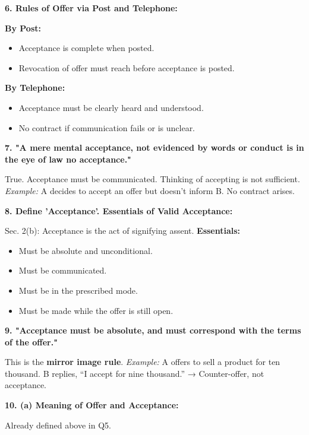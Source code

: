 \documentclass[12pt,a4paper]{book}
\begin{document}
\vspace{0.5cm}
\textbf{6. Rules of Offer via Post and Telephone:}  

\textbf{By Post:}
\begin{itemize}
    \item Acceptance is complete when posted.
    \item Revocation of offer must reach before acceptance is posted.
\end{itemize}

\textbf{By Telephone:}
\begin{itemize}
    \item Acceptance must be clearly heard and understood.
    \item No contract if communication fails or is unclear.
\end{itemize}

\vspace{0.5cm}
\textbf{7. "A mere mental acceptance, not evidenced by words or conduct is in the eye of law no acceptance."}  

True. Acceptance must be communicated. Thinking of accepting is not sufficient.  
\textit{Example:} A decides to accept an offer but doesn’t inform B. No contract arises.

\vspace{0.5cm}
\textbf{8. Define 'Acceptance'. Essentials of Valid Acceptance:}  

Sec. 2(b): Acceptance is the act of signifying assent.  
\textbf{Essentials:}
\begin{itemize}
    \item Must be absolute and unconditional.
    \item Must be communicated.
    \item Must be in the prescribed mode.
    \item Must be made while the offer is still open.
\end{itemize}

\vspace{0.5cm}
\textbf{9. "Acceptance must be absolute, and must correspond with the terms of the offer."}  

This is the \textbf{mirror image rule}.  
\textit{Example:} A offers to sell a product for ten thousand. B replies, “I accept for nine thousand.” → Counter-offer, not acceptance.

\vspace{0.5cm}
\textbf{10. (a) Meaning of Offer and Acceptance:}  

Already defined above in Q5.
\end{document}
